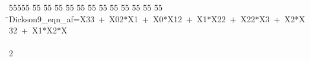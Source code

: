%
%
\begin{tabbing}
55555 \= 55 \= 55 \= 55 \= 55 \= 55 \= 55 \= 55 \= 55 \= 55 \= 55 \= 55 \= 55 \= \>Dickson9\_eqn\_af=X33\ +\ X02*X1\ +\ X0*X12\ +\ X1*X22\ +\ X22*X3\ +\ X2*X32\ +\ X1*X2*X\\[0pt]
\\[0pt]
2\>\end{tabbing}
